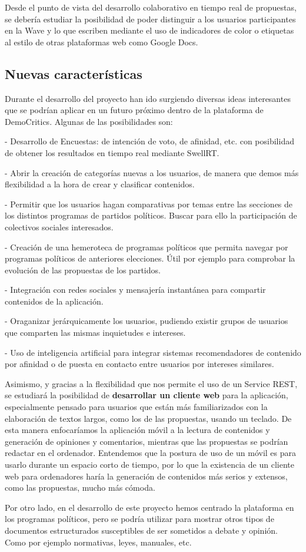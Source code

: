 Desde el punto de vista del desarrollo colaborativo en tiempo real de propuestas, se debería estudiar la posibilidad de poder distinguir a los usuarios participantes en la Wave y lo que escriben mediante el uso de indicadores de color o etiquetas al estilo de otras plataformas web como Google Docs. 

\subsection{Nuevas características}

Durante el desarrollo del proyecto han ido surgiendo diversas ideas interesantes que se podrían aplicar en un futuro próximo dentro de la plataforma de DemoCritics. Algunas de las posibilidades son:

- Desarrollo de Encuestas: de intención de voto, de afinidad, etc. con posibilidad de obtener los resultados en tiempo real mediante SwellRT.

- Abrir la creación de categorías nuevas a los usuarios, de manera que demos más flexibilidad a la hora de crear y clasificar contenidos.

- Permitir que los usuarios hagan comparativas por temas entre las secciones de los distintos programas de partidos políticos. Buscar para ello la participación de colectivos sociales interesados.  

- Creación de una hemeroteca de programas políticos que permita navegar por programas políticos de anteriores elecciones. Útil por ejemplo para comprobar la evolución de las propuestas de los partidos.

- Integración con redes sociales y mensajería instantánea para compartir contenidos de la aplicación.

- Oraganizar jerárquicamente los usuarios, pudiendo existir grupos de usuarios que comparten las mismas inquietudes e intereses.

- Uso de inteligencia artificial para integrar sistemas recomendadores de contenido por afinidad o de puesta en contacto entre usuarios por intereses similares.
 
Asimismo, y gracias a la flexibilidad que nos permite el uso de un Service REST, se estudiará la posibilidad de \textbf{desarrollar un cliente web} para la aplicación, especialmente pensado para usuarios que están más familiarizados con la elaboración de textos largos, como los de las propuestas, usando un teclado. De esta manera enfocaríamos la aplicación móvil a la lectura de contenidos y generación de opiniones y comentarios, mientras que las propuestas se podrían redactar en el ordenador. Entendemos que la postura de uso de un móvil es para usarlo durante un espacio corto de tiempo, por lo que la existencia de un cliente web para ordenadores haría la generación de contenidos más serios y extensos, como las propuestas, mucho más cómoda.

Por otro lado, en el desarrollo de este proyecto hemos centrado la plataforma en los programas políticos, pero se podría utilizar para mostrar otros tipos de documentos estructurados susceptibles de ser sometidos a debate y opinión. Como por ejemplo normativas, leyes, manuales, etc.






